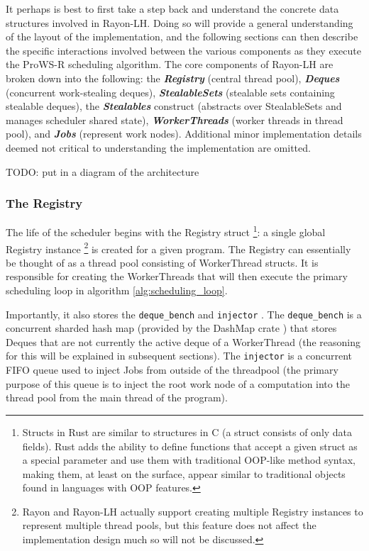 \documentclass[bsc,frontabs,singlespacing,parskip,deptreport,normalheadings]{infthesis}
\begin{document}
It perhaps is best to first take a step back and understand the concrete data
structures involved in Rayon-LH. Doing so will provide a general understanding
of the layout of the implementation, and the following sections can then
describe the specific interactions involved between the various components as
they execute the ProWS-R scheduling algorithm. The core components of Rayon-LH
are broken down into the following: the \textbf{\textit{Registry}} (central
thread pool), \textbf{\textit{Deques}} (concurrent work-stealing deques),
\textbf{\textit{StealableSets}} (stealable sets containing stealable deques),
the \textbf{\textit{Stealables}} construct (abstracts over StealableSets and
manages scheduler shared state), \textbf{\textit{WorkerThreads}} (worker threads
in thread pool), and \textbf{\textit{Jobs}} (represent work nodes). Additional
minor implementation details deemed not critical to understanding the
implementation are omitted.

TODO: put in a diagram of the architecture

\subsubsection*{The Registry}

The life of the scheduler begins with the Registry struct \footnote{Structs in
    Rust are similar to structures in C (a struct consists of only data fields).
    Rust adds the ability to define functions that accept a given struct as a
    special parameter and use them with traditional OOP-like method syntax,
    making them, at least on the surface, appear similar to traditional objects
    found in languages with OOP features.}: a single global Registry instance
    \footnote{Rayon and Rayon-LH actually support creating multiple Registry
    instances to represent multiple thread pools, but this feature does not
affect the implementation design much so will not be discussed.} is created for
a given program. The Registry can essentially be thought of as a thread pool
consisting of WorkerThread structs. It is responsible for creating the
WorkerThreads that will then execute the primary scheduling loop in algorithm
\ref{alg:scheduling_loop}.

Importantly, it also stores the \texttt{deque\_bench}
and \texttt{injector} . The \texttt{deque\_bench} is a concurrent sharded hash
map (provided by the DashMap crate \cite{joel_dashmap_2022}) that stores Deques
that are not currently the active deque of a WorkerThread (the reasoning for
this will be explained in subsequent sections). The \texttt{injector} is a
concurrent FIFO queue used to inject Jobs from outside of the threadpool (the
primary purpose of this queue is to inject the root work node of a computation
into the thread pool from the main thread of the program).
\end{document}
